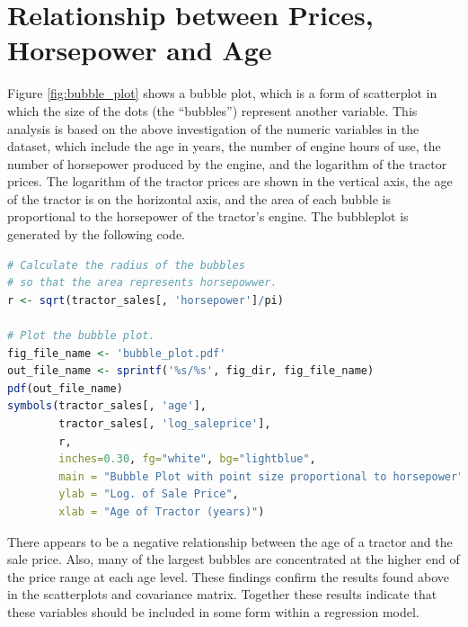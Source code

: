\documentclass[11pt]{book}
\begin{document}
\pagebreak
\section{Relationship between Prices, Horsepower and Age}


Figure \ref{fig:bubble_plot}
shows a bubble plot,
which is a form of scatterplot in which the size of the dots (the ``bubbles'')
represent another variable.
This analysis is based on the above investigation
of the numeric variables in the dataset,
which include
the age in years, the number of engine hours of use,
the number of horsepower produced by the engine,
and the logarithm of the tractor prices.
The logarithm of the tractor prices are shown in the vertical axis,
the age of the tractor is on the horizontal axis,
and the area of each bubble is proportional
to the horsepower of the tractor's engine.
The bubbleplot is
generated by the following code.

\vfill

\begin{lstlisting}[language=R]
# Calculate the radius of the bubbles
# so that the area represents horsepowwer.
r <- sqrt(tractor_sales[, 'horsepower']/pi)

# Plot the bubble plot.
fig_file_name <- 'bubble_plot.pdf'
out_file_name <- sprintf('%s/%s', fig_dir, fig_file_name)
pdf(out_file_name)
symbols(tractor_sales[, 'age'],
        tractor_sales[, 'log_saleprice'],
        r,
        inches=0.30, fg="white", bg="lightblue",
        main = "Bubble Plot with point size proportional to horsepower",
        ylab = "Log. of Sale Price",
        xlab = "Age of Tractor (years)")
\end{lstlisting}


\pagebreak

There appears to be a negative relationship between
the age of a tractor and the sale price.
Also, many of the largest bubbles are concentrated at the higher end of
the price range at each age level.
These findings confirm the results found above in the scatterplots
and covariance matrix.
Together these results indicate that these variables should be included
in some form within a regression model.
\end{document}
